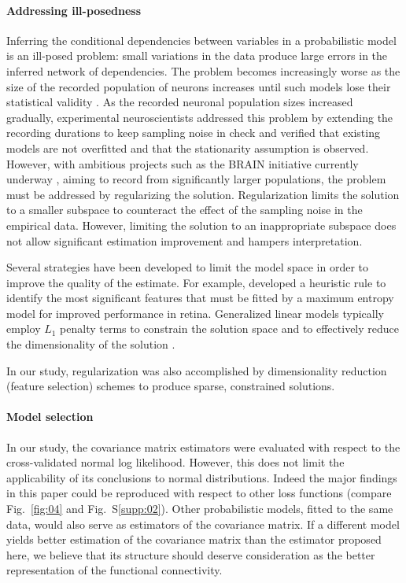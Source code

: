 \documentclass[10pt]{article}
\begin{document}
\paragraph{Addressing ill-posedness}
Inferring the conditional dependencies between variables in a probabilistic model is an ill-posed problem: small variations in the data produce large errors in the inferred network of dependencies.  The problem becomes increasingly worse as the size of the recorded population of neurons increases until such models lose their statistical validity \cite{Roudi:2009}.  As the recorded neuronal population sizes increased gradually, experimental neuroscientists addressed this problem by extending the recording durations to keep sampling noise in check and verified that existing models are not overfitted and that the stationarity assumption is observed\cite{Tkacik:2013}.  However, with ambitious projects such as the BRAIN initiative currently underway \cite{Alivisatos:2013}, aiming to record from significantly larger populations, the problem must be addressed by regularizing the solution. Regularization limits the solution to a smaller subspace to counteract the effect of the sampling noise in the empirical data. However, limiting the solution to an inappropriate subspace does not allow significant estimation improvement and hampers interpretation.

Several strategies have been developed to limit the model space in order to improve the quality of the estimate. For example, \cite{Ganmor:2011} developed a heuristic rule to identify the most significant features that must be fitted by a maximum entropy model for improved performance in retina. Generalized linear models typically employ $L_1$ penalty terms to constrain the solution space and to effectively reduce the dimensionality of the solution \cite{Pillow:2008}.  

In our study, regularization was also accomplished by dimensionality reduction (feature selection) schemes to produce sparse, constrained solutions.


\paragraph{Model selection}
In our study, the covariance matrix estimators were evaluated with respect to the cross-validated normal log likelihood.  However, this does not limit the applicability of its conclusions to normal distributions. Indeed the major findings in this paper could be reproduced with respect to other loss functions (compare Fig.~\ref{fig:04} and Fig.~S\ref{supp:02}).  Other probabilistic models, fitted to the same data, would also serve as estimators of the covariance matrix.  If a different model yields better estimation of the covariance matrix than the estimator proposed here, we believe that its structure should deserve consideration as the better representation of the functional connectivity.
\end{document}
